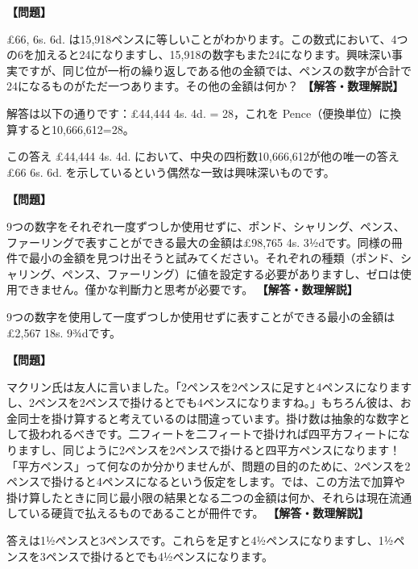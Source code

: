 \documentclass[10pt,a4paper,oneside,openany]{ltjsbook}
\begin{document}
\begin{tcolorbox}[colback=softblue,colframe=primaryblue,title=\textbf{第 12 問：A QUEER THING IN MONEY.},arc=2mm,boxrule=1pt,breakable]
\textbf{【問題】}\par\vspace{0.3em}
£66, 6s. 6d. は15,918ペンスに等しいことがわかります。この数式において、4つの6を加えると24になりますし、15,918の数字もまた24になります。興味深い事実ですが、同じ位が一桁の繰り返しである他の金額では、ペンスの数字が合計で24になるものがただ一つあります。その他の金額は何か？
\tcblower
\textbf{【解答・数理解説】}\par\vspace{0.3em}
解答は以下の通りです：£44,444 4s. 4d. = 28，これを Pence（便換単位）に換算すると10,666,612=28。

この答え £44,444 4s. 4d. において、中央の四桁数10,666,612が他の唯一の答え £66 6s. 6d. を示しているという偶然な一致は興味深いものです。
\end{tcolorbox}

\begin{tcolorbox}[colback=softblue,colframe=primaryblue,title=\textbf{第 13 問：新しいお金のパズル （原題: A NEW MONEY PUZZLE.）},arc=2mm,boxrule=1pt,breakable]
\textbf{【問題】}\par\vspace{0.3em}
9つの数字をそれぞれ一度ずつしか使用せずに、ポンド、シャリング、ペンス、ファーリングで表すことができる最大の金額は£98,765 4s. 3½dです。同様の冊件で最小の金額を見つけ出そうと試みてください。それぞれの種類（ポンド、シャリング、ペンス、ファーリング）に値を設定する必要がありますし、ゼロは使用できません。僅かな判斷力と思考が必要です。
\tcblower
\textbf{【解答・数理解説】}\par\vspace{0.3em}
9つの数字を使用して一度ずつしか使用せずに表すことができる最小の金額は£2,567 18s. 9¾dです。
\end{tcolorbox}

\begin{tcolorbox}[colback=softblue,colframe=primaryblue,title=\textbf{第 14 問：円銭の平方 （原題: SQUARE MONEY.）},arc=2mm,boxrule=1pt,breakable]
\textbf{【問題】}\par\vspace{0.3em}
マクリン氏は友人に言いました。「2ペンスを2ペンスに足すと4ペンスになりますし、2ペンスを2ペンスで掛けるとでも4ペンスになりますね。」もちろん彼は、お金同士を掛け算すると考えているのは間違っています。掛け数は抽象的な数字として扱われるべきです。二フィートを二フィートで掛ければ四平方フィートになりますし、同じように2ペンスを2ペンスで掛けると四平方ペンスになります！「平方ペンス」って何なのか分かりませんが、問題の目的のために、2ペンスを2ペンスで掛けると4ペンスになるという仮定をします。では、この方法で加算や掛け算したときに同じ最小限の結果となる二つの金額は何か、それらは現在流通している硬貨で払えるものであることが冊件です。
\tcblower
\textbf{【解答・数理解説】}\par\vspace{0.3em}
答えは1½ペンスと3ペンスです。これらを足すと4½ペンスになりますし、1½ペンスを3ペンスで掛けるとでも4½ペンスになります。
\end{tcolorbox}
\end{document}
